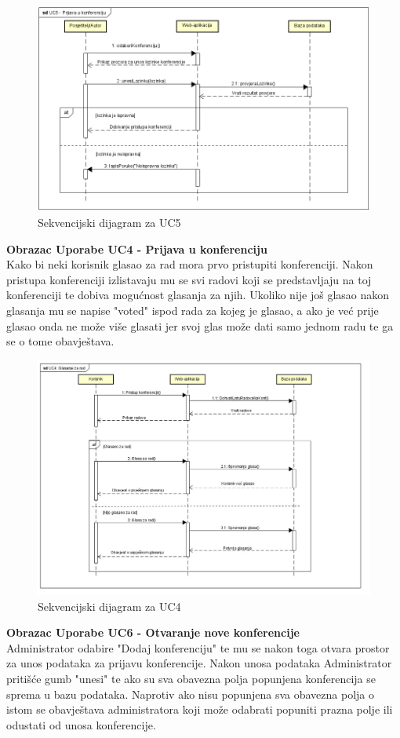 		\begin{figure}[H]
			\includegraphics[scale=0.7]{slike/UC5.PNG} 
			\centering
			\caption{Sekvencijski dijagram za UC5}
			\label{fig:UC5}
		\end{figure}
		\newpage
		\textbf{Obrazac Uporabe UC4 - Prijava u konferenciju}\\Kako bi neki korisnik glasao za rad mora prvo pristupiti konferenciji. Nakon pristupa konferenciji izlistavaju mu se svi radovi koji se predstavljaju na toj konferenciji te dobiva mogućnost glasanja za njih. Ukoliko nije još glasao nakon glasanja mu se napise "voted" ispod rada za kojeg je glasao, a ako je već prije glasao onda ne može više glasati jer svoj glas može dati samo jednom radu te ga se o tome obavještava.
		
		\begin{figure}[H]
			\includegraphics[scale=0.7]{slike/UC4_glas_rad.jpg} 
			\centering
			\caption{Sekvencijski dijagram za UC4}
			\label{fig:UC5}
		\end{figure}
		\newpage
		\textbf{Obrazac Uporabe UC6 - Otvaranje nove konferencije}\\Administrator odabire "Dodaj konferenciju" te mu se nakon toga otvara prostor za unos podataka za prijavu konferencije. Nakon unosa podataka Administrator pritišće gumb "unesi" te ako su sva obavezna polja popunjena konferencija se sprema u bazu podataka. Naprotiv ako nisu popunjena sva obavezna polja o istom se obavještava administratora koji može odabrati popuniti prazna polje ili odustati od unosa konferencije.
		

